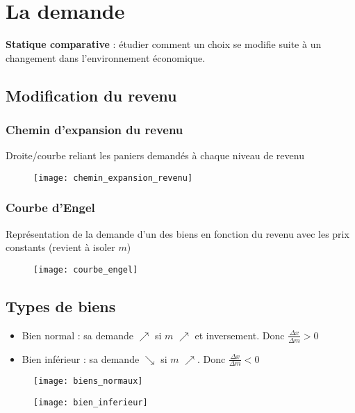 \section{La demande}

\textbf{Statique comparative} : étudier comment un choix se modifie suite à un changement dans l'environnement économique.

\subsection{Modification du revenu}

\subsubsection{Chemin d'expansion du revenu}

Droite/courbe reliant les paniers demandés à chaque niveau de revenu

\begin{figure}[H]
	\centering
	\texttt{[image: chemin\_expansion\_revenu]}
\end{figure}

\subsubsection{Courbe d'Engel}

Représentation de la demande d'un des biens en fonction du revenu avec les prix constants (revient à isoler $m$)

\begin{figure}[H]
	\centering
	\texttt{[image: courbe\_engel]}
\end{figure}

\subsection{Types de biens}

\begin{itemize}
\item  Bien normal : sa demande $\nearrow$ si $m$ $\nearrow$ et inversement. Donc $\frac{\Delta x}{\Delta m} > 0$
\item Bien inférieur : sa demande $\searrow$ si $m$ $\nearrow$. Donc $\frac{\Delta x}{\Delta m} < 0$
\end{itemize}

\begin{minipage}{0.48\textwidth}
	\begin{figure}[H]
		\centering
		\texttt{[image: biens\_normaux]}
	\end{figure}
\end{minipage}
\begin{minipage}{0.5\textwidth}
	\begin{figure}[H]
		\centering
		\texttt{[image: bien\_inferieur]}
	\end{figure}
\end{minipage}

